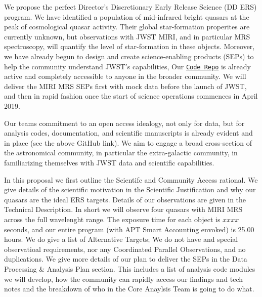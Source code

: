 We propose the perfect Director’s Discretionary Early Release Science
(DD ERS) program. We have identified a population of mid-infrared
bright quasars at the peak of cosmological quasar activity. Their
global star-formation properites are currently unknown, but
observations with JWST MIRI, and in particular MRS spectroscopy, will
quantify the level of star-formation in these objects.
Moreover, we have already begun to design and create science-enabling
products (SEPs) to help the community understand JWST's capabilities,
Our \href{https://github.com/d80b2t/JWST_ERS}{{\tt Code Repo}} is 
already active and completely accessible to anyone in the broader community. 
We will deliver the MIRI MRS SEPs first with mock data before the launch of
JWST, and then in rapid fashion once the start of science operations
commences in April 2019.

\smallskip \smallskip
\noindent
Our teams commitment to an open access idealogy, not only for data,
but for analysis codes, documentation, and scientific manuscripts is
already evident and in place (see the above GitHub link).  We aim to
engage a broad cross-section of the astronomical community, in
particular the extra-galactic community, in familiarizing themselves
with JWST data and scientific capabilities.

\smallskip \smallskip
\noindent
In this proposal we first outline the Scientifc and Community Access rational. 
We give details of the scientific motivation in the Scientific Justification and why our quasars are the ideal ERS targets. 
Details of our observations are given in the Technical Description. In short we will observe four quasars with MIRI MRS across the full wavelenght range. The exposure time for each object is $xxxx$ seconds, and our entire program (with APT Smart Accounting envoked) is 25.00 hours. 
We do give a list of Alternative Targets; We do not have and special observatioal requirements, nor any
Coordinated Parallel Observations, and no duplications.
We give more details of our plan to deliver the SEPs in the Data Processing \& Analysis Plan section. This includes a list of analysis code modules we will develop, how the community can rapidly access our findings and tech notes and the breakdown of who in the Core Anaylsis Team is going to do what. 


